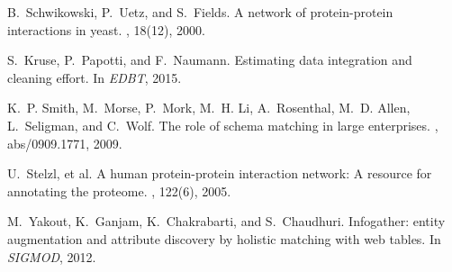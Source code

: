 \documentclass{vldb}
\begin{document}
{\begin{thebibliography}{10}
B.~Schwikowski, P.~Uetz, and S.~Fields.
\newblock A network of protein-protein interactions in yeast.
, 18(12), 2000.

S.~Kruse, P.~Papotti, and F.~Naumann.
\newblock Estimating data integration and cleaning effort.
\newblock In {\em EDBT}, 2015.

K.~P. Smith, M.~Morse, P.~Mork, M.~H. Li, A.~Rosenthal, M.~D. Allen,
  L.~Seligman, and C.~Wolf.
\newblock The role of schema matching in large enterprises.
, abs/0909.1771, 2009.

U.~Stelzl, et al.
\newblock A human protein-protein interaction network: A resource for
  annotating the proteome.
, 122(6), 2005.

M.~Yakout, K.~Ganjam, K.~Chakrabarti, and S.~Chaudhuri.
\newblock Infogather: entity augmentation and attribute discovery by holistic
  matching with web tables.
\newblock In {\em SIGMOD}, 2012.

\end{thebibliography}}

%
\end{document}
